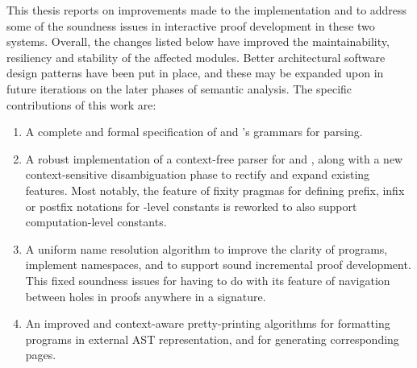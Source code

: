 This thesis reports on improvements made to the implementation \Beluga and \Harpoon to address some of the soundness issues in interactive proof development in these two systems.
Overall, the changes listed below have improved the maintainability, resiliency and stability of the affected modules.
Better architectural software design patterns have been put in place, and these may be expanded upon in future iterations on the later phases of semantic analysis.
The specific contributions of this work are:
\begin{enumerate}
\item
A complete and formal specification of \Beluga and \Harpoon's grammars for parsing.
\item
A robust implementation of a context-free parser for \Beluga and \Harpoon, along with a new context-sensitive disambiguation phase to rectify and expand existing features.
Most notably, the \Beluga feature of fixity pragmas for defining prefix, infix or postfix notations for \LF-level constants is reworked to also support computation-level constants.
\item
A uniform name resolution algorithm to improve the clarity of \Beluga programs, implement namespaces, and to support sound incremental proof development.
This fixed soundness issues for \Harpoon having to do with its feature of navigation between holes in proofs anywhere in a \Beluga signature.
\item
An improved and context-aware pretty-printing algorithms for formatting \Beluga programs in external \ac{AST} representation, and for generating corresponding \HTML pages.
\end{enumerate}



